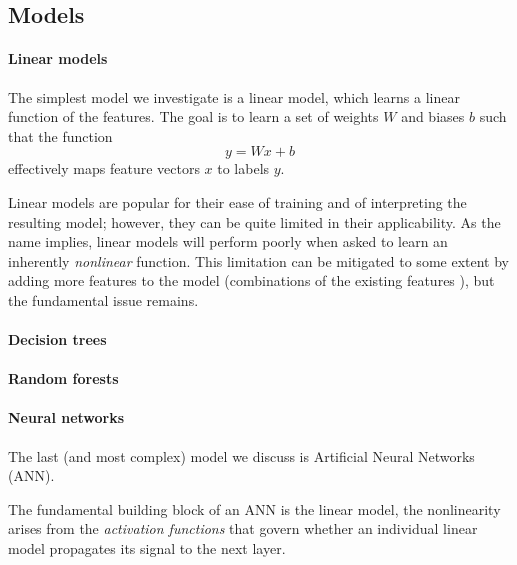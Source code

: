 \subsection{Models}
\label{sec:models}

\paragraph{Linear models}
The simplest model we investigate is a linear model, which learns a
linear function of the features.
%
The goal is to learn a set of weights $W$ and biases $b$ such that the
function
%
$$
y = Wx + b
$$
%
effectively maps feature vectors $x$ to labels $y$.


Linear models are popular for their ease of training and of interpreting
the resulting model; however, they can be quite limited in their
applicability.
%
As the name implies, linear models will perform poorly when asked to
learn an inherently \emph{nonlinear} function.
%
This limitation can be mitigated to some extent by adding more features
to the model (\eg combinations of the existing features ), but
the fundamental issue remains.

\paragraph{Decision trees}

\paragraph{Random forests}

\paragraph{Neural networks}
The last (and most complex) model we discuss is Artificial Neural
Networks (ANN).

The fundamental building block of an ANN is the linear model, the
nonlinearity arises from the \emph{activation functions} that govern
whether an individual linear model propagates its signal to the next layer.





